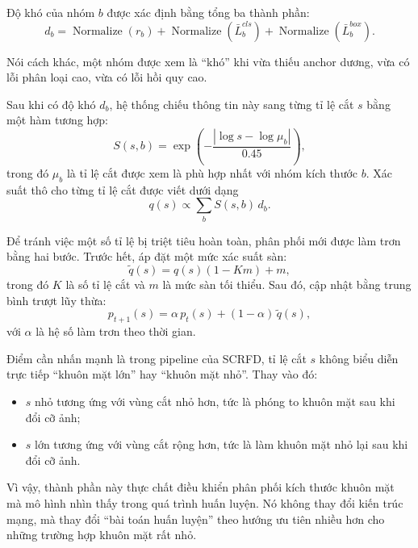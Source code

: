 Độ khó của nhóm \(b\) được xác định bằng tổng ba thành phần:
\begin{equation}
d_b =
\operatorname{Normalize}(r_b) +
\operatorname{Normalize}(\bar{L}^{cls}_b) +
\operatorname{Normalize}(\bar{L}^{box}_b).
\end{equation}

Nói cách khác, một nhóm được xem là ``khó'' khi vừa thiếu anchor dương, vừa có lỗi phân loại cao, vừa có lỗi hồi quy cao.

Sau khi có độ khó \(d_b\), hệ thống chiếu thông tin này sang từng tỉ lệ cắt \(s\) bằng một hàm tương hợp:
\begin{equation}
S(s,b) =
\exp\!\left(
  -\frac{\left|\log s - \log \mu_b\right|}{0.45}
\right),
\end{equation}
trong đó \(\mu_b\) là tỉ lệ cắt được xem là phù hợp nhất với nhóm kích thước \(b\).
Xác suất thô cho từng tỉ lệ cắt được viết dưới dạng
\begin{equation}
q(s) \propto \sum_b S(s,b)\, d_b.
\end{equation}

Để tránh việc một số tỉ lệ bị triệt tiêu hoàn toàn, phân phối mới được làm trơn bằng hai bước.
Trước hết, áp đặt một mức xác suất sàn:
\begin{equation}
\tilde{q}(s) = q(s)(1-Km) + m,
\end{equation}
trong đó \(K\) là số tỉ lệ cắt và \(m\) là mức sàn tối thiểu.
Sau đó, cập nhật bằng trung bình trượt lũy thừa:
\begin{equation}
p_{t+1}(s) = \alpha\, p_t(s) + (1-\alpha)\, \tilde{q}(s),
\end{equation}
với \(\alpha\) là hệ số làm trơn theo thời gian.

Điểm cần nhấn mạnh là trong pipeline của SCRFD, tỉ lệ cắt \(s\) không biểu diễn trực tiếp ``khuôn mặt lớn'' hay ``khuôn mặt nhỏ''.
Thay vào đó:
\begin{itemize}
  \item \(s\) nhỏ tương ứng với vùng cắt nhỏ hơn, tức là phóng to khuôn mặt sau khi đổi cỡ ảnh;
  \item \(s\) lớn tương ứng với vùng cắt rộng hơn, tức là làm khuôn mặt nhỏ lại sau khi đổi cỡ ảnh.
\end{itemize}

Vì vậy, thành phần này thực chất điều khiển phân phối kích thước khuôn mặt mà mô hình nhìn thấy trong quá trình huấn luyện.
Nó không thay đổi kiến trúc mạng, mà thay đổi ``bài toán huấn luyện'' theo hướng ưu tiên nhiều hơn cho những trường hợp khuôn mặt rất nhỏ.

